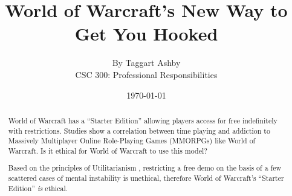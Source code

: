 \documentclass[11pt]{article}
\begin{document}


\title{\vfill World of Warcraft's New Way to Get You Hooked} %
\author{
By Taggart Ashby \vspace{10pt} \\
CSC 300: Professional Responsibilities  \vspace{10pt} \\
}
\date{\today} %

\maketitle


\vfill  %
\begin{abstract}
World of Warcraft has a ``Starter Edition'' allowing players access for free indefinitely with restrictions. \cite{starterEditionNewsRelease} Studies show a correlation between time playing and addiction to Massively Multiplayer Online Role-Playing Games (MMORPGs) like World of Warcraft. \cite{ProblemUsageAmongHighlyEngagedPlayers}\cite{JustAComputerGameRight} Is it ethical for World of Warcraft to use this model?

Based on the principles of Utilitarianism \cite{Utilitarianism}, restricting a free demo on the basis of a few scattered cases of mental instability is unethical, therefore World of Warcraft's ``Starter Edition'' \emph{is} ethical.
\end{abstract}

\thispagestyle{empty} %
\newpage


\thispagestyle{empty}  %
\tableofcontents
\end{document}
